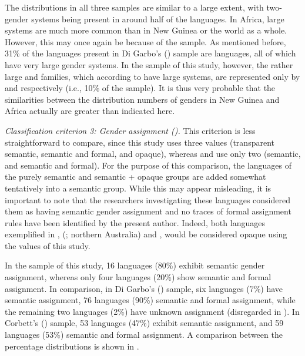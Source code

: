 \documentclass[output=collectionpaper]{langsci/langscibook}
\begin{document}
The distributions in all three samples are similar to a large extent, with two-gender systems being present in around half of the languages. In Africa, large systems are much more common than in New Guinea or the world as a whole. However, this may once again be because of the sample. As mentioned before, 31\% of the languages present in Di Garbo's (\citealt*{DiGarbo2014}) sample are  languages, all of which have very large gender systems. In the sample of this study, however, the rather large  and  families, which according to \citet[372]{Foley2000} have large systems, are represented only by  and  respectively (i.e., 10\% of the sample). It is thus very probable that the similarities between the distribution numbers of genders in New Guinea and Africa actually are greater than indicated here.


\textit{Classification criterion 3: Gender assignment ().} This criterion is less straightforward to compare, since this study uses three values (transparent semantic, semantic and formal, and opaque), whereas \citet{DiGarbo2014} and \citet{Corbett2013b} use only two (semantic, and semantic and formal). For the purpose of this comparison, the languages of the purely semantic and semantic + opaque groups are added somewhat tentatively into a semantic group. While this may appear misleading, it is important to note that the researchers investigating these languages considered them as having semantic gender assignment and no traces of formal assignment rules have been identified by the present author. Indeed, both languages exemplified in \citet{Corbett2013b},  (; northern Australia) and , would be considered opaque using the values of this study.



In the sample of this study, 16 languages (80\%) exhibit semantic gender assignment, whereas only four languages (20\%) show semantic and formal assignment.  In comparison, in Di Garbo's (\citealt*[67]{DiGarbo2014}) sample, six languages (7\%) have semantic assignment, 76 languages (90\%) semantic and formal assignment, while the remaining two languages (2\%) have unknown assignment (disregarded in ). In Corbett's (\citealt*{Corbett2013b}) sample, 53 languages (47\%) exhibit semantic assignment, and 59 languages (53\%) semantic and formal assignment. A comparison between the percentage distributions is shown in .
\end{document}
